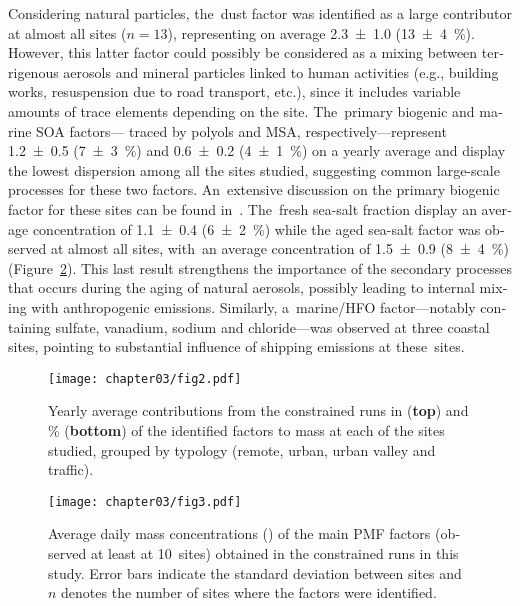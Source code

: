\begin{otherlanguage}{english}
Considering natural particles, the~dust factor was identified as a large contributor at
almost all sites ($n=13$), representing on average \SI{2.3\pm1.0}{\concum}
(\SI{13\pm4}{\percent}). However, this latter factor could possibly be considered as a
mixing between terrigenous aerosols and mineral particles linked to human activities
(e.g., building works, resuspension due to road transport, etc.), since it includes
variable amounts of trace elements depending on the site. The~primary biogenic and marine
SOA factors--- traced by polyols and MSA, respectively---represent \SI{1.2\pm0.5}{\concum}
(\SI{7\pm3}{\%}) and \SI{0.6\pm0.2}{\concum} (\SI{4\pm1}{\%}) on a yearly average and
display the lowest dispersion among all the sites studied, suggesting common large-scale
processes for these two factors. An~extensive discussion on the primary biogenic factor
for these sites can be found in~\textcite{samakePolyols2019}.  The~fresh sea-salt fraction
display an average concentration of \SI{1.1\pm0.4}{\concum} (\SI{6\pm2}{\%}) while the
aged sea-salt factor was observed at almost all sites, with~an average concentration of
\SI{1.5\pm0.9}{\concum} (\SI{8\pm4}{\%}) (Figure~\ref{fig:fig3}). This last result
strengthens the importance of the secondary processes that occurs during the aging of
natural aerosols, possibly leading to internal mixing with anthropogenic emissions.
Similarly, a~marine/HFO factor---notably containing sulfate, vanadium, sodium and
chloride---was observed at three coastal sites, pointing   to substantial influence of
shipping emissions at these~sites. 

\begin{figure}[ht]
    \centering
    \texttt{[image: chapter03/fig2.pdf]}
    \caption{Yearly average contributions from the constrained runs in
        \si{\concum} (\textbf{top}) and \si{\percent} (\textbf{bottom}) of the identified factors to
        \PM{} mass at each of the sites studied, grouped by typology (remote, urban,
urban valley and traffic).} 
\label{fig:fig2}
\end{figure}

\begin{figure}[ht]
    \centering
    \texttt{[image: chapter03/fig3.pdf]}
    \caption{Average daily mass concentrations (\si{\concum}) of the main PMF factors
        (observed at least at 10~sites) obtained in the constrained runs in
        this study. Error bars indicate the standard deviation between sites
        and $n$ denotes the number of sites where the factors were identified.}
    \label{fig:fig3}
\end{figure}



\end{otherlanguage}
